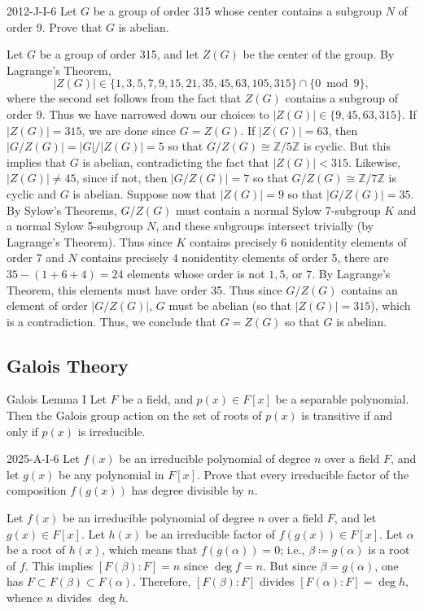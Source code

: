 \documentclass{article}
\begin{document}
	\begin{prb}{2012-J-I-6}
		Let $G$ be a group of order 315 whose center contains a subgroup $N$ of order 9. Prove that $G$ is abelian. 
	\end{prb}
	Let $G$ be a group of order 315, and let $Z(G)$ be the center of the group. By Lagrange's Theorem, 
	\begin{equation*}
		|Z(G)| \in \{1, 3, 5, 7, 9,15, 21, 35, 45, 63, 105, 315\} \cap \{0 \bmod{9}\}, 
	\end{equation*}
	where the second set follows from the fact that $Z(G)$ contains a subgroup of order 9. Thus we have narrowed down our choices to $|Z(G)| \in \{9, 45, 63, 315\}$. If $|Z(G)| = 315$, we are done since $G = Z(G)$. If $|Z(G)| = 63$, then $|G/Z(G)| = |G|/|Z(G)| = 5$ so that $G/Z(G) \cong \mathbb{Z}/5\mathbb{Z}$ is cyclic. But this implies that $G$ is abelian, contradicting the fact that $|Z(G)| < 315$. Likewise, $|Z(G)| \neq 45$, since if not, then $|G/Z(G)| = 7$ so that $G/Z(G) \cong \mathbb{Z}/7\mathbb{Z}$ is cyclic and $G$ is abelian. Suppose now that $|Z(G)| = 9$ so that $|G/Z(G)| = 35$. By Sylow's Theorems, $G/Z(G)$ must contain a normal Sylow 7-subgroup $K$ and a normal Sylow 5-subgroup $N$, and these subgroups intersect trivially (by Lagrange's Theorem). Thus since $K$ contains precisely 6 nonidentity elements of order 7 and $N$ contains precisely $4$ nonidentity elements of order 5, there are $35 - (1 + 6 + 4) = 24$ elements whose order is not $1, 5$, or $7$. By Lagrange's Theorem, this elements must have order 35. Thus since $G/Z(G)$ contains an element of order $|G/Z(G)|$, $G$ must be abelian (so that $|Z(G)| = 315$), which is a contradiction. Thus, we conclude that $G = Z(G)$ so that $G$ is abelian. 
	
	
	
	\subsection{Galois Theory}
	
	\begin{prb}{Galois Lemma I}
		Let $F$ be a field, and $p(x) \in F[x]$ be a separable polynomial. Then the Galois group action on the set of roots of $p(x)$ is transitive if and only if $p(x)$ is irreducible. 
	\end{prb}
	
	\begin{prb}{2025-A-I-6}
		Let $f(x)$ be an irreducible polynomial of degree $n$ over a field $F$, and let $g(x)$ be any polynomial in $F[x]$. Prove that every irreducible factor of the composition $f(g(x))$ has degree divisible by $n$. 
	\end{prb}
	Let $f(x)$ be an irreducible polynomial of degree $n$ over a field $F$, and let $g(x) \in F[x]$. Let $h(x)$ be an irreducible factor of $f(g(x)) \in F[x]$. Let $\alpha$ be a root of $h(x)$, which means that $f(g(\alpha)) = 0$; i.e., $\beta \coloneqq g(\alpha)$ is a root of $f$. This implies $[F(\beta):F] = n$ since $\deg{f} = n$. But since $\beta = g(\alpha)$, one has $F \subset F(\beta)\subset F(\alpha)$. Therefore, $[F(\beta):F]$ divides $[F(\alpha):F] = \deg{h}$, whence $n$ divides $\deg{h}$. 
	
\end{document}
